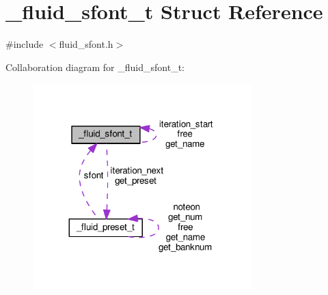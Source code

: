 \hypertarget{struct__fluid__sfont__t}{}\section{\+\_\+fluid\+\_\+sfont\+\_\+t Struct Reference}
\label{struct__fluid__sfont__t}


{\ttfamily \#include $<$fluid\+\_\+sfont.\+h$>$}



Collaboration diagram for \+\_\+fluid\+\_\+sfont\+\_\+t\+:
\nopagebreak
\begin{figure}[H]
\begin{center}
\leavevmode
\includegraphics[width=239pt]{struct__fluid__sfont__t__coll__graph}
\end{center}
\end{figure}
